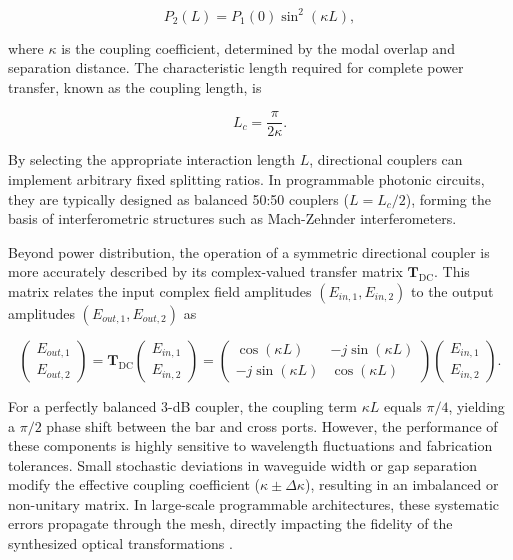 \begin{equation}
P_2(L) = P_1(0)\sin^2(\kappa L),
\end{equation}

\noindent where $\kappa$ is the coupling coefficient, determined by the modal overlap and 
separation distance. 
\newpage
\noindent The characteristic length required for complete power transfer, known as the coupling 
length, is

\begin{equation}
L_c = \frac{\pi}{2\kappa}.
\end{equation}

By selecting the appropriate interaction length $L$, directional couplers can implement arbitrary
fixed splitting ratios. In programmable photonic circuits, they are typically designed as balanced
50:50 couplers ($L = L_c/2$), forming the basis of interferometric structures such as Mach-Zehnder
interferometers.

Beyond power distribution, the operation of a symmetric directional coupler is more accurately 
described by its complex-valued transfer matrix $\mathbf{T}_{\text{DC}}$. This matrix relates the 
input complex field amplitudes $(E_{in,1}, E_{in,2})$ to the output amplitudes 
$(E_{out,1}, E_{out,2})$ as

\begin{equation}
\begin{pmatrix} E_{out,1} \\ E_{out,2} \end{pmatrix} = \mathbf{T}_{\text{DC}} \begin{pmatrix} 
    E_{in,1} \\ E_{in,2} \end{pmatrix} = \begin{pmatrix} \cos(\kappa L) & -j\sin(\kappa L) \\ 
        -j\sin(\kappa L) & \cos(\kappa L) \end{pmatrix} \begin{pmatrix} E_{in,1} \\ E_{in,2} 
        \end{pmatrix}.
\label{eq:matrix_dc}
\end{equation}


For a perfectly balanced 3-dB coupler, the coupling term $\kappa L$ equals $\pi/4$, yielding a 
$\pi/2$ phase shift between the bar and cross ports. However, the performance of these components 
is highly sensitive to wavelength fluctuations and fabrication tolerances. Small stochastic 
deviations in waveguide width or gap separation modify the effective coupling coefficient 
($\kappa \pm \Delta\kappa$), resulting in an imbalanced or non-unitary matrix. In large-scale 
programmable architectures, these systematic errors propagate through the mesh, directly 
impacting the fidelity of the synthesized optical transformations 
\cite{chrostowskiSiliconPhotonicsDesign2015}.

